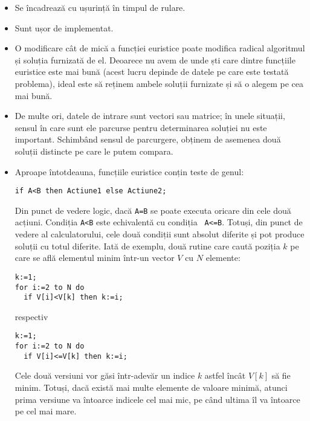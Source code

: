 \begin{itemize}

\item Se încadrează cu ușurință în timpul de rulare.

\item Sunt ușor de implementat.

\item O modificare cât de mică a funcției euristice poate modifica radical
  algoritmul și soluția furnizată de el. Deoarece nu avem de unde ști care
  dintre funcțiile euristice este mai bună (acest lucru depinde de datele pe
  care este testată problema), ideal este să reținem ambele soluții furnizate
  și să o alegem pe cea mai bună.

\item De multe ori, datele de intrare sunt vectori sau matrice; în unele
  situații, sensul în care sunt ele parcurse pentru determinarea soluției nu
  este important. Schimbând sensul de parcurgere, obținem de asemenea două
  soluții distincte pe care le putem compara.

\item Aproape întotdeauna, funcțiile euristice conțin teste de genul:

\begin{verbatim}
if A<B then Actiune1 else Actiune2;
\end{verbatim}

Din punct de vedere logic, dacă {\tt A=B} se poate executa oricare din cele
două acțiuni. Condiția {\tt A<B} este echivalentă cu condiția {\tt
  A<=B}. Totuși, din punct de vedere al calculatorului, cele două condiții
sunt absolut diferite și pot produce soluții cu totul diferite. Iată de
exemplu, două rutine care caută poziția $k$ pe care se află elementul minim
într-un vector $V$ cu $N$ elemente:

\begin{verbatim}
k:=1;
for i:=2 to N do
  if V[i]<V[k] then k:=i;
\end{verbatim}

respectiv

\begin{verbatim}
k:=1;
for i:=2 to N do
  if V[i]<=V[k] then k:=i;
\end{verbatim}

Cele două versiuni vor găsi într-adevăr un indice $k$ astfel încât $V[k]$ să
fie minim. Totuși, dacă există mai multe elemente de valoare minimă, atunci
prima versiune va întoarce indicele cel mai mic, pe când ultima îl va întoarce
pe cel mai mare.

\end{itemize}

